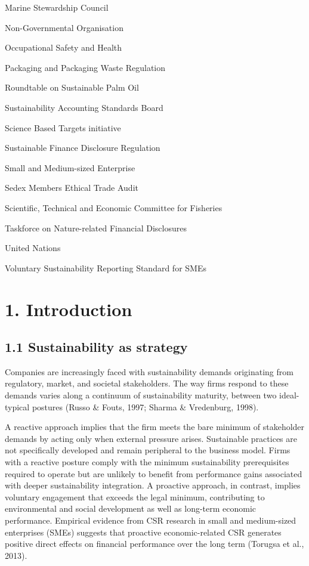 \documentclass[
]{article}
\begin{document}
\begin{description}[leftmargin=2.6cm,style=nextline]
\item[MSC] Marine Stewardship Council
\item[NGO] Non-Governmental Organisation
\item[OSH] Occupational Safety and Health
\item[PPWR] Packaging and Packaging Waste Regulation
\item[RSPO] Roundtable on Sustainable Palm Oil
\item[SASB] Sustainability Accounting Standards Board
\item[SBTi] Science Based Targets initiative
\item[SFDR] Sustainable Finance Disclosure Regulation
\item[SME] Small and Medium-sized Enterprise
\item[SMETA] Sedex Members Ethical Trade Audit
\item[STECF] Scientific, Technical and Economic Committee for Fisheries
\item[TNFD] Taskforce on Nature-related Financial Disclosures
\item[UN] United Nations
\item[VSME] Voluntary Sustainability Reporting Standard for SMEs
\end{description}
\clearpage

\iffalse %
\section{1. Introduction}\label{introduction}

\subsection{1.1 Sustainability as
strategy}\label{sustainability-as-strategy}

Companies are increasingly faced with sustainability demands originating
from regulatory, market, and societal stakeholders. The way firms
respond to these demands varies along a continuum of sustainability
maturity, between two ideal-typical postures (Russo \& Fouts, 1997;
Sharma \& Vredenburg, 1998).

A reactive approach implies that the firm meets the bare minimum of
stakeholder demands by acting only when external pressure arises.
Sustainable practices are not specifically developed and remain
peripheral to the business model. Firms with a reactive posture comply
with the minimum sustainability prerequisites required to operate but
are unlikely to benefit from performance gains associated with deeper
sustainability integration. A proactive approach, in contrast, implies
voluntary engagement that exceeds the legal minimum, contributing to
environmental and social development as well as long-term economic
performance. Empirical evidence from CSR research in small and
medium-sized enterprises (SMEs) suggests that proactive economic-related
CSR generates positive direct effects on financial performance over the
long term (Torugsa et al., 2013).
\end{document}
